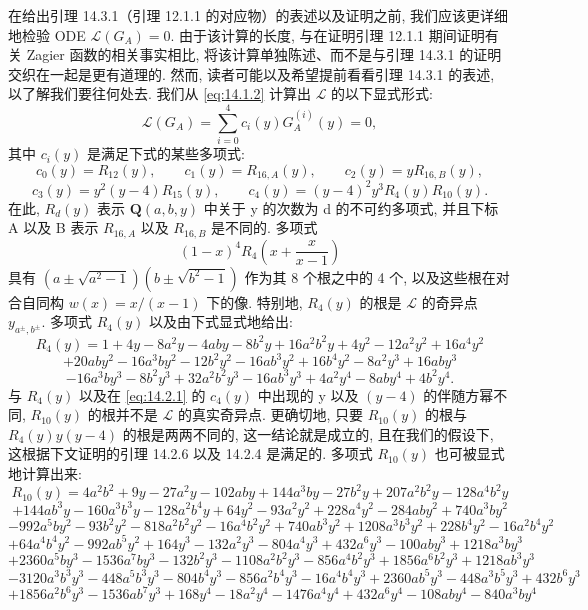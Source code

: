 在给出引理 14.3.1（引理 12.1.1 的对应物）的表述以及证明之前, 
我们应该更详细地检验 ODE \(\mathcal{L}(G_A) = 0\). 
由于该计算的长度, 与在证明引理 12.1.1 期间证明有关 Zagier 函数的相关事实相比, 
将该计算单独陈述、而不是与引理 14.3.1 的证明交织在一起是更有道理的. 
然而, 读者可能以及希望提前看看引理 14.3.1 的表述, 
以了解我们要往何处去. 
我们从 \eqref{eq:14.1.2} 计算出 \(\mathcal{L}\) 的以下显式形式:
\[ \mathcal{L}(G_A) = \sum_{i=0}^{4} c_i(y) G_A^{(i)}(y) = 0, \]
其中 \(c_i(y)\) 是满足下式的某些多项式:
\begin{equation}\label{eq:14.2.1}
c_{0}(y) = R_{12}(y), \qquad c_{1}(y) = R_{16,A}(y), \qquad c_{2}(y) = yR_{16,B}(y),
\end{equation}
\[ c_{3}(y) = y^{2}(y - 4)R_{15}(y), \qquad c_{4}(y) = (y - 4)^{2}y^{3}R_{4}(y)R_{10}(y). \]
在此, \(R_d(y)\) 表示 \(\mathbf{Q}(a, b, y)\) 中关于 y 的次数为 d 的不可约多项式, 
并且下标 A 以及 B 表示 \(R_{16,A}\) 以及 \(R_{16,B}\) 是不同的. 
多项式
\[ (1-x)^4 R_4 \left(x + \frac{x}{x-1}\right) \]
具有 \((a\pm \sqrt{a^2 - 1})(b\pm \sqrt{b^2 - 1})\) 作为其 8 个根之中的 4 个, 
以及这些根在对合自同构 \(w(x) = x/(x-1)\) 下的像. 
特别地, \(R_4(y)\) 的根是 \(\mathcal{L}\) 的奇异点 \(y_{a^{\pm},b^{\pm}}\). 
多项式 \(R_4(y)\) 以及由下式显式地给出:
\[ R_4(y) = 1 + 4y - 8a^2y - 4aby - 8b^2y + 16a^2b^2y + 4y^2 - 12a^2y^2 + 16a^4y^2 \]
\[ + 20aby^2 - 16a^3by^2 - 12b^2y^2 - 16ab^3y^2 + 16b^4y^2 - 8a^2y^3 + 16aby^3 \]
\[ - 16a^3by^3 - 8b^2y^3 + 32a^2b^2y^3 - 16ab^3y^3 + 4a^2y^4 - 8aby^4 + 4b^2y^4. \]
与 \(R_4(y)\) 以及在 \eqref{eq:14.2.1} 的 \(c_4(y)\) 中出现的 y 以及 \((y-4)\) 
的伴随方幂不同, \(R_{10}(y)\) 的根并不是 \(\mathcal{L}\) 的真实奇异点. 
更确切地, 只要 \(R_{10}(y)\) 的根与 \(R_4(y)y(y-4)\) 的根是两两不同的, 这一结论就是成立的, 
且在我们的假设下, 这根据下文证明的引理 14.2.6 以及 14.2.4 是满足的. 
多项式 \(R_{10}(y)\) 也可被显式地计算出来:
\[ R_{10}(y) = 4a^2b^2 + 9y - 27a^2y - 102aby + 144a^3by - 27b^2y + 207a^2b^2y - 128a^4b^2y \]
\[ + 144ab^3y - 160a^3b^3y - 128a^2b^4y + 64y^2 - 93a^2y^2 + 228a^4y^2 - 284aby^2 + 740a^3by^2 \]
\[ - 992a^5by^2 - 93b^2y^2 - 818a^2b^2y^2 - 16a^4b^2y^2 + 740ab^3y^2 + 1208a^3b^3y^2 + 228b^4y^2 - 16a^2b^4y^2 \]
\[ + 64a^4b^4y^2 - 992ab^5y^2 + 164y^3 - 132a^2y^3 - 804a^4y^3 + 432a^6y^3 - 100aby^3 + 1218a^3by^3 \]
\[ + 2360a^5by^3 - 1536a^7by^3 - 132b^2y^3 - 1108a^2b^2y^3 - 856a^4b^2y^3 + 1856a^6b^2y^3 + 1218ab^3y^3 \]
\[ - 3120a^3b^3y^3 - 448a^5b^3y^3 - 804b^4y^3 - 856a^2b^4y^3 - 16a^4b^4y^3 + 2360ab^5y^3 - 448a^3b^5y^3 + 432b^6y^3 \]
\[ + 1856a^2b^6y^3 - 1536ab^7y^3 + 168y^4 - 18a^2y^4 - 1476a^4y^4 + 432a^6y^4 - 108aby^4 - 840a^3by^4 \]
